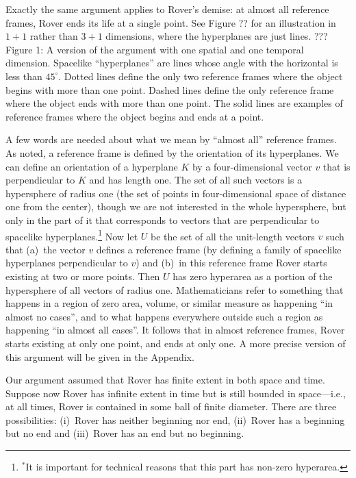 Exactly the same argument applies to Rover's demise: at almost all reference frames, Rover ends its life at a single point. 
See Figure ?? for an illustration in $1+1$ rather than $3+1$ dimensions, where the hyperplanes are just lines.
??? Figure 1: A version of the argument with one spatial and one temporal dimension. Spacelike ``hyperplanes'' are lines whose angle with the horizontal is 
less than $45^\circ$. Dotted lines define the only two reference frames where the object begins with more than one point. Dashed lines define the only reference frame where the object ends with more than one point. The solid lines are examples of reference frames where the object begins and ends at a point.

A few words are needed about what we mean by ``almost all'' reference frames. As noted, a reference frame is defined by the 
orientation of its hyperplanes. We can define an orientation of a hyperplane $K$ by a four-dimensional vector $v$ that is 
perpendicular to $K$ and has length one. The set of all such vectors is a hypersphere of radius one (the set of points in 
four-dimensional space of distance one from the center), though we are not interested in the whole hypersphere, but only in 
the part of it that corresponds to vectors that are perpendicular to spacelike hyperplanes.\footnote{$^*$It is important for 
technical reasons that this part has non-zero hyperarea.} Now let $U$ be the set of all the unit-length vectors $v$ such that 
(a)~the vector $v$ defines a reference frame (by defining a family of spacelike hyperplanes perpendicular to $v$) and (b)~in 
this reference frame Rover starts existing at two or more points. Then $U$ has zero hyperarea as a portion of the hypersphere 
of all vectors of radius one. Mathematicians refer to something that happens in a region of zero area, volume, or similar 
measure as happening ``in almost no cases'', and to what happens everywhere outside such a region as happening ``in almost 
all cases''. It follows that in almost reference frames, Rover starts existing at only one point, and ends at only one.  
A more precise version of this argument will be given in the Appendix.

Our argument assumed that Rover has finite extent in both space and time. Suppose now Rover has infinite extent in time but 
is still bounded in space---i.e., at all times, Rover is contained in some ball of finite diameter.
There are three possibilities: (i)~Rover has neither beginning nor end, (ii)~Rover has a beginning but no end and (iii)~Rover
has an end but no beginning. 

